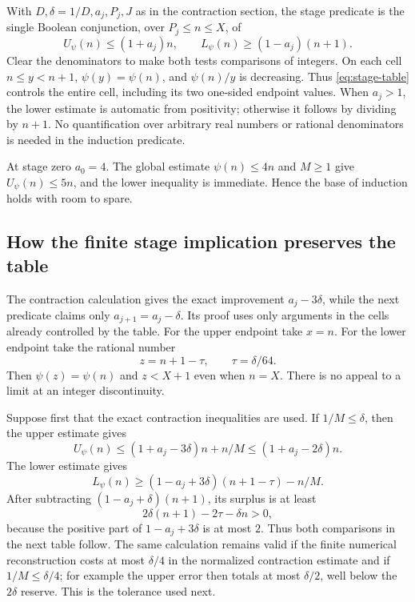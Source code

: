 \documentclass[11pt]{article}
\theoremstyle{definition}
\theoremstyle{remark}
\begin{document}
With $D,\delta=1/D,a_j,P_j,J$ as in the contraction section, the stage
predicate is the single Boolean conjunction, over $P_j\le n\le X$, of
\begin{equation}\label{eq:stage-table}
 U_\psi(n)\le(1+a_j)n,
 \qquad L_\psi(n)\ge(1-a_j)(n+1).
\end{equation}
Clear the denominators to make both tests comparisons of integers. On each
cell $n\le y<n+1$, $\psi(y)=\psi(n)$, and $\psi(n)/y$ is decreasing.
Thus \eqref{eq:stage-table} controls the entire cell, including its two
one-sided endpoint values. When $a_j>1$, the lower estimate is automatic
from positivity; otherwise it follows by dividing by $n+1$.
No quantification over arbitrary real numbers or rational denominators is
needed in the induction predicate.

At stage zero $a_0=4$. The global estimate $\psi(n)\le4n$ and $M\ge1$
give $U_\psi(n)\le5n$, and the lower inequality is immediate. Hence the
base of induction holds with room to spare.

\subsection{How the finite stage implication preserves the table}

The contraction calculation gives the exact improvement $a_j-3\delta$,
while the next predicate claims only $a_{j+1}=a_j-\delta$.
Its proof uses only arguments in the cells already controlled by the table.
For the upper endpoint take $x=n$. For the lower endpoint take the rational
number
\[
 z=n+1-\tau,\qquad \tau=\delta/64.
\]
Then $\psi(z)=\psi(n)$ and $z<X+1$ even when $n=X$.
There is no appeal to a limit at an integer discontinuity.

Suppose first that the exact contraction inequalities are used. If
$1/M\le\delta$, then the upper estimate gives
\[
 U_\psi(n)\le(1+a_j-3\delta)n+n/M
 \le(1+a_j-2\delta)n.
\]
The lower estimate gives
\[
 L_\psi(n)\ge(1-a_j+3\delta)(n+1-\tau)-n/M.
\]
After subtracting $(1-a_j+\delta)(n+1)$, its surplus is at least
\[
 2\delta(n+1)-2\tau-\delta n>0,
\]
because the positive part of $1-a_j+3\delta$ is at most $2$.
Thus both comparisons in the next table follow.
The same calculation remains valid if the finite numerical reconstruction
costs at most $\delta/4$ in the normalized contraction estimate and if
$1/M\le\delta/4$; for example the upper error then totals at most
$\delta/2$, well below the $2\delta$ reserve. This is the tolerance used next.
\end{document}
